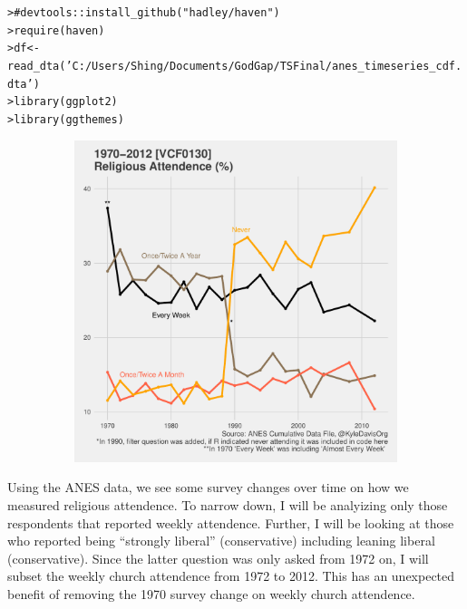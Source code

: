 \documentclass[12pt]{article}\usepackage[]{graphicx}\usepackage[]{color}
\makeatletter
\newcommand{\hlstr}[1]{\textcolor[rgb]{0.82,0.78,0.62}{#1}}%
\newcommand{\hlcom}[1]{\textcolor[rgb]{0.404,0.408,0.42}{#1}}%
\newcommand{\hlstd}[1]{\textcolor[rgb]{0.882,0.878,0.898}{#1}}%
\newcommand{\hlkwb}[1]{\textcolor[rgb]{0.902,0.675,0.196}{#1}}%
\newcommand{\hlkwd}[1]{\textcolor[rgb]{0.733,0.388,0.812}{#1}}%
\newenvironment{kframe}{%
 \def\at@end@of@kframe{}%
 \ifinner\ifhmode%
  \def\at@end@of@kframe{\end{minipage}}%
  \begin{minipage}{\columnwidth}%
 \fi\fi%
 \def\FrameCommand##1{\hskip\@totalleftmargin \hskip-\fboxsep
 \colorbox{shadecolor}{##1}\hskip-\fboxsep
     \hskip-\linewidth \hskip-\@totalleftmargin \hskip\columnwidth}%
 \MakeFramed {\advance\hsize-\width
   \@totalleftmargin\z@ \linewidth\hsize
   \@setminipage}}%
 {\par\unskip\endMakeFramed%
 \at@end@of@kframe}
\newenvironment{knitrout}{}{} %
\makeatother
\begin{document}
\begin{flushleft}
\begin{knitrout}
\color{fgcolor}\begin{kframe}
\begin{alltt}
\hlstd{> }\hlcom{# devtools::install_github("hadley/haven")}
\hlstd{> }\hlkwd{require}\hlstd{(haven)}
\hlstd{> }\hlstd{df} \hlkwb{<-} \hlkwd{read_dta}\hlstd{(}\hlstr{'C:/Users/Shing/Documents/GodGap/TS Final/anes_timeseries_cdf.dta'}\hlstd{)}
\hlstd{> }\hlkwd{library}\hlstd{(ggplot2)}
\hlstd{> }\hlkwd{library}\hlstd{(ggthemes)}
\end{alltt}
\end{kframe}
\end{knitrout}

\begin{center}
\begin{knitrout}
\color{fgcolor}
\includegraphics[width=6in,height=3.7in]{figure/desc-1} 

\end{knitrout}
\end{center}

Using the ANES data, we see some survey changes over time on how we measured religious attendence. To narrow down, I will be analyizing only those respondents that reported weekly attendence. Further, I will be looking at those who reported being ``strongly liberal'' (conservative) including leaning liberal (conservative). Since the latter question was only asked from 1972 on, I will subset the weekly church attendence from 1972 to 2012. This has an unexpected benefit of removing the 1970 survey change on weekly church attendence.


\end{flushleft}
\end{document}
